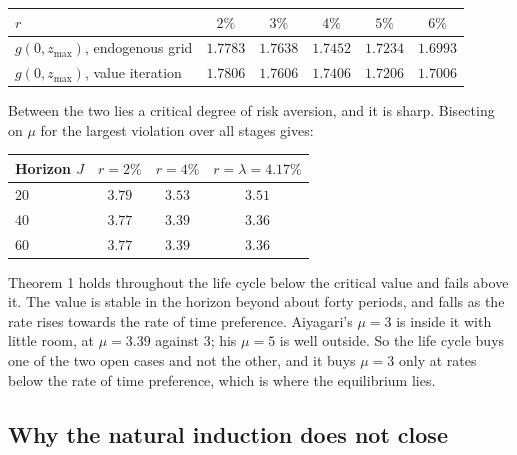 \begingroup\small
\begin{center}
\begin{tabular}{@{}lccccc@{}}
\toprule
$r$ & $2\%$ & $3\%$ & $4\%$ & $5\%$ & $6\%$ \\
\midrule
$g(0,z_{\max})$, endogenous grid & $1.7783$ & $1.7638$ & $1.7452$ & $1.7234$ & $1.6993$ \\
$g(0,z_{\max})$, value iteration & $1.7806$ & $1.7606$ & $1.7406$ & $1.7206$ & $1.7006$ \\
\bottomrule
\end{tabular}
\end{center}
\endgroup

Between the two lies a critical degree of risk aversion, and it is sharp. Bisecting on $\mu$ for
the largest violation over all stages gives:

\begingroup\small
\begin{center}
\begin{tabular}{@{}lccc@{}}
\toprule
Horizon $J$ & $r=2\%$ & $r=4\%$ & $r=\lambda=4.17\%$ \\
\midrule
$20$ & $3.79$ & $3.53$ & $3.51$ \\
$40$ & $3.77$ & $3.39$ & $3.36$ \\
$60$ & $3.77$ & $3.39$ & $3.36$ \\
\bottomrule
\end{tabular}
\end{center}
\endgroup

Theorem 1 holds throughout the life cycle below the critical value and fails above it. The value
is stable in the horizon beyond about forty periods, and falls as the rate rises towards the rate
of time preference. Aiyagari's $\mu=3$ is inside it with little room, at $\mu=3.39$ against
$3$; his $\mu=5$ is well outside. So the life cycle buys one of the two open cases and not the
other, and it buys $\mu=3$ only at rates below the rate of time preference, which is where the
equilibrium lies.

\subsection{Why the natural induction does not close}

